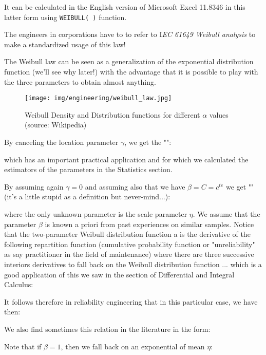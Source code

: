 	It can be calculated in the English version of Microsoft Excel 11.8346 in this latter form using \texttt{WEIBULL( )} function.
	\begin{tcolorbox}[title=Remark,colframe=black,arc=10pt]
	The engineers in corporations have to to refer to I\textit{EC 61649 Weibull analysis} to make a standardized usage of this law!
	\end{tcolorbox}
	The Weibull law can be seen as a generalization of the exponential distribution function (we'll see why later!) with the advantage that it is possible to play with the three parameters to obtain almost anything.
	\begin{figure}[H]
		\begin{center}
			\texttt{[image: img/engineering/weibull\_law.jpg]}
		\end{center}	
		\caption[Weibull Density and Distribution functions for different $\alpha$ values]{Weibull Density and Distribution functions for different $\alpha$ values (source: Wikipedia)}
	\end{figure}
	By canceling the location parameter $\gamma$, we get the "":
	
	which has an important practical application and for which we calculated the estimators of the parameters in the Statistics section.
	
	By assuming again $\gamma=0$ and assuming also that we have $\beta=C=c^{te}$ we get "" (it's a little stupid as a definition but never-mind...):
	
	where the only unknown parameter is the scale parameter $\eta$. We assume that the parameter $\beta$ is known a priori from past experiences on similar samples. Notice that the two-parameter Weibull distribution function a is the derivative of the following repartition function (cumulative probability function or "unreliability" as say practitioner in the field of maintenance) where there are three successive interiors derivatives to fall back on the Weibull distribution function ... which is a good application of this we saw in the section of Differential and Integral Calculus:
	
	It follows therefore in reliability engineering that in this particular case, we have then:
	
	We also find sometimes this relation in the literature in the form:
	
	Note that if $\beta=1$, then we fall back on an exponential of mean $\eta$:
	

